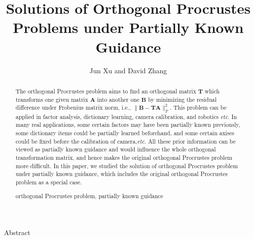 \documentclass[titlepage,11pt,twoside]{article}
\begin{document}

\title{Solutions of Orthogonal Procrustes Problems under Partially Known Guidance}

\author{Jun Xu and David Zhang }






\begin{center}\vskip3pt


\vspace{32pt}

Abstract\vskip3pt

\end{center}


\begin{abstract}
The orthogonal Procrustes problem aims to find an orthogonal matrix $\mathbf{T}$ which transforms one given matrix $\mathbf{A}$ into another one $\mathbf{B}$ by minimizing the residual difference under Frobenius matrix norm, i.e., $\|\mathbf{B}-\mathbf{T}\mathbf{A}\|_{F}^{2}$. This problem can be applied in factor analysis, dictionary learning, camera calibration, and robotics \emph{etc}. In many real applications, some certain factors may have been partially known previously, some dictionary items could be partially learned beforehand, and some certain axises could be fixed before the calibration of camera,\emph{etc}. All these prior information can be viewed as partially known guidance and would influence the whole orthogonal transformation matrix, and hence makes the original orthogonal Procrustes problem more difficult. In this paper, we studied the solution of orthogonal Procrustes problem under partially known guidance, which includes the original orthogonal Procrustes problem as a special case.
\begin{keywords}
orthogonal Procrustes problem, partially known guidance
\end{keywords}
\end{abstract}
\end{document}

